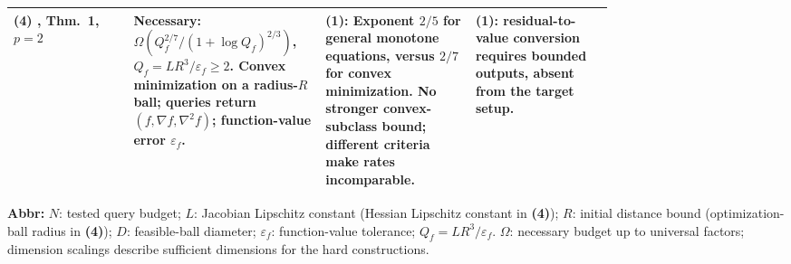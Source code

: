 \begin{table}[tp]
\begin{threeparttable}
\begin{tabularx}{\linewidth}{@{}>{\raggedright\arraybackslash}p{0.20\linewidth}>{\raggedright\arraybackslash}p{0.32\linewidth}>{\raggedright\arraybackslash}p{0.25\linewidth}>{\raggedright\arraybackslash}X@{}}
\midrule
\textbf{(4)} \citep{gjmeGargEtAl2021v1}, Thm.~1, $p=2$ & Necessary: $\Omega(Q_f^{2/7}/(1+\log Q_f)^{2/3})$, $Q_f=LR^3/\varepsilon_f\ge2$. Convex minimization on a radius-$R$ ball; queries return $(f,\nabla f,\nabla^2 f)$; function-value error $\varepsilon_f$. & \textbf{(1)}: Exponent $2/5$ for general monotone equations, versus $2/7$ for convex minimization. No stronger convex-subclass bound; different criteria make rates incomparable. & \textbf{(1)}: residual-to-value conversion requires bounded outputs, absent from the target setup. \\
\bottomrule
\end{tabularx}
\begin{tablenotes}[flushleft]\footnotesize
\item[] \textbf{Abbr:} $N$: tested query budget; $L$: Jacobian Lipschitz constant (Hessian Lipschitz constant in \textbf{(4)}); $R$: initial distance bound (optimization-ball radius in \textbf{(4)}); $D$: feasible-ball diameter; $\varepsilon_f$: function-value tolerance; $Q_f=LR^3/\varepsilon_f$. $\Omega$: necessary budget up to universal factors; dimension scalings describe sufficient dimensions for the hard constructions.
\end{tablenotes}
\end{threeparttable}
\end{table}
\clearpage

